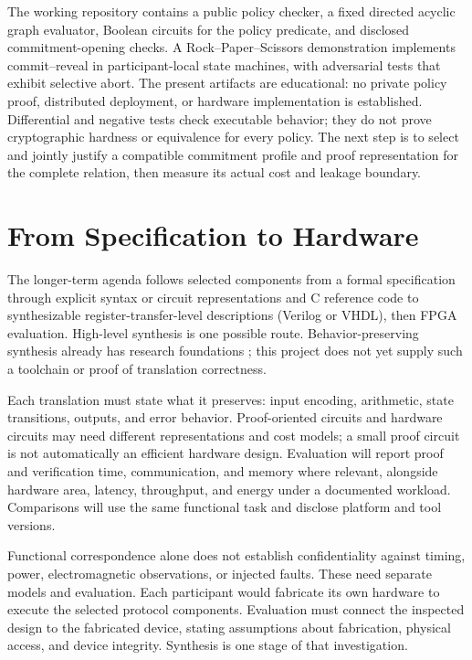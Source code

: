 \documentclass[conference,letterpaper]{IEEEtran}
\begin{document}
The working repository contains a public policy checker, a fixed directed
acyclic graph evaluator, Boolean circuits for the policy predicate, and
disclosed commitment-opening checks. A Rock--Paper--Scissors demonstration
implements commit--reveal in participant-local state machines, with adversarial
tests that exhibit selective abort. The present artifacts are educational: no private
policy proof, distributed deployment, or hardware implementation is
established. Differential and negative tests check executable behavior;
they do not prove cryptographic hardness or equivalence for every policy.
The next step is to select and jointly justify a compatible commitment
profile and proof representation for the complete relation, then measure
its actual cost and leakage boundary.

\balance
\section{From Specification to Hardware}
The longer-term agenda follows selected components from a formal
specification through explicit syntax or circuit representations and C
reference code to synthesizable register-transfer-level descriptions
(Verilog or VHDL), then FPGA evaluation. High-level synthesis is one possible
route. Behavior-preserving synthesis already has research foundations
\cite{herklotz2021}; this project does not yet supply such a toolchain or
proof of translation correctness.

Each translation must state what it preserves: input encoding, arithmetic,
state transitions, outputs, and error behavior. Proof-oriented circuits and
hardware circuits may need different representations and cost models; a
small proof circuit is not automatically an efficient hardware design.
Evaluation will report proof and verification time, communication, and memory
where relevant, alongside hardware area, latency, throughput, and energy
under a documented workload. Comparisons will use the same functional task
and disclose platform and tool versions.

Functional correspondence alone does not establish confidentiality against
timing, power, electromagnetic observations, or injected faults. These need
separate models and evaluation. Each participant would fabricate its own
hardware to execute the selected protocol components. Evaluation must connect
the inspected design to the fabricated device, stating assumptions about
fabrication, physical access, and device integrity. Synthesis is one stage
of that investigation.
\end{document}
